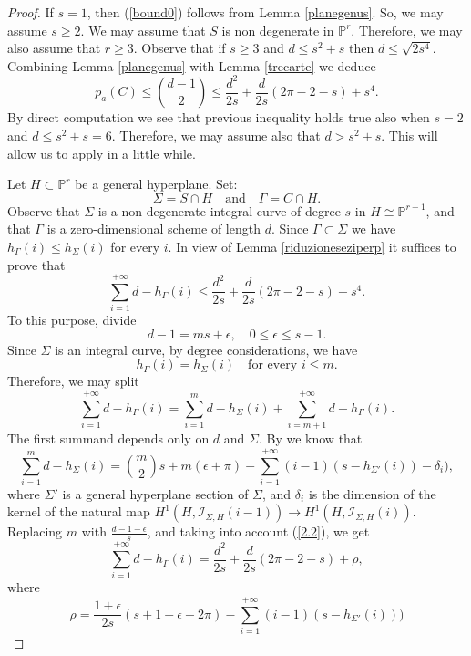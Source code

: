 \documentclass[9pt,a4paper]{amsart}
\theoremstyle{plain}
\theoremstyle{definition}
\theoremstyle{remark}
\begin{document}
\begin{proof} If $s=1$, then (\ref{bound0}) follows from Lemma \ref{planegenus}.
So, we may assume $s\geq 2$. We may assume that $S$ is non degenerate
in $\mathbb P^r$. Therefore, we may also assume that $r\geq 3$.
Observe that if $s\geq 3$ and $d\leq s^2+s$ then $d\leq
\sqrt{2s^4}$. Combining Lemma \ref{planegenus} with Lemma
\ref{trecarte} we deduce
$$
p_a(C)\leq \binom{d-1}{2}\leq
\frac{d^2}{2s}+\frac{d}{2s}(2\pi-2-s)+s^4.
$$
By direct computation we see that previous inequality holds true
also when $s=2$ and $d\leq s^2+s=6$. Therefore, we may assume also
that $d>s^2+s$. This will allow us to apply \cite[Lemma]{D3} in a
little while.

\smallskip
Let $H\subset \mathbb P^r$ be a general hyperplane. Set:
$$
\Sigma=S\cap H\quad{\text{and}}\quad \Gamma=C\cap H.
$$
Observe that $\Sigma$ is a non degenerate integral curve of degree
$s$ in $H\cong \mathbb P^{r-1}$, and that $\Gamma$ is a
zero-dimensional scheme of length $d$. Since $\Gamma\subset \Sigma$
we have $h_{\Gamma}(i)\leq h_{\Sigma}(i)$ for every $i$. In view of
Lemma \ref{riduzioneseziperp} it suffices to prove that
$$
\sum_{i=1}^{+\infty}d-h_{\Gamma}(i)\leq
\frac{d^2}{2s}+\frac{d}{2s}(2\pi-2-s)+s^4.
$$
To this purpose, divide
\begin{equation}\label{divide}
d-1=ms+\epsilon,\quad 0\leq \epsilon\leq s-1.
\end{equation}
Since $\Sigma$ is an integral curve, by degree considerations, we
have
\begin{equation}\label{Bezout}
h_{\Gamma}(i)=h_{\Sigma}(i)\quad {\text{for every $i\leq m$.}}
\end{equation}
Therefore, we may split
\begin{equation}\label{2.2}
\sum_{i=1}^{+\infty}d-h_{\Gamma}(i)=\sum_{i=1}^{m}d-h_{\Sigma}(i)+\sum_{i=m+1}^{+\infty}d-h_{\Gamma}(i).
\end{equation}
The first summand depends only on $d$ and $\Sigma$. By \cite[Proof
of Lemma, p. 795, line 8 from above]{D3} we know that
$$
\sum_{i=1}^{m}d-h_{\Sigma}(i)=\binom{m}{2}s+m(\epsilon +
\pi)-\sum_{i=1}^{+\infty}(i-1)(s-h_{\Sigma'}(i))-\delta_i),
$$
where $\Sigma'$ is a general hyperplane section of $\Sigma$, and
$\delta_i$ is the dimension of the kernel of the natural map
$H^1(H,\mathcal I_{\Sigma,H}(i-1))\to H^1(H,\mathcal
I_{\Sigma,H}(i))$. Replacing $m$ with $\frac{d-1-\epsilon}{s}$, and
taking into account (\ref{2.2}), we get
$$
\sum_{i=1}^{+\infty}d-h_{\Gamma}(i)=\frac{d^2}{2s}+\frac{d}{2s}(2\pi-2-s)+\rho,
$$
where
$$
\rho=\frac{1+\epsilon}{2s}(s+1-\epsilon-2\pi)-\sum_{i=1}^{+\infty}(i-1)(s-h_{\Sigma'}(i)))
$$
\end{proof}
\end{document}
